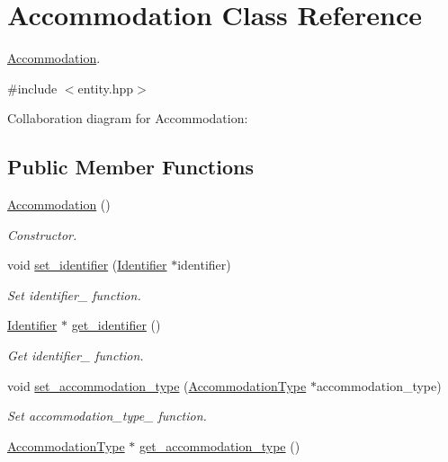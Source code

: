\hypertarget{classAccommodation}{}\section{Accommodation Class Reference}
\label{classAccommodation}


\hyperlink{classAccommodation}{Accommodation}.  




{\ttfamily \#include $<$entity.\+hpp$>$}



Collaboration diagram for Accommodation\+:
\subsection*{Public Member Functions}
\begin{DoxyCompactItemize}
\item 
\hyperlink{classAccommodation_a6bc8f615e1bdb56c47f1c64d125ba6de}{Accommodation} ()
\begin{DoxyCompactList}\small\item\em Constructor. \end{DoxyCompactList}\item 
void \hyperlink{classAccommodation_a10f294e3f2beb3e3c160ccacf6e3ba69}{set\+\_\+identifier} (\hyperlink{classIdentifier}{Identifier} $\ast$identifier)
\begin{DoxyCompactList}\small\item\em Set identifier\+\_\+ function. \end{DoxyCompactList}\item 
\hyperlink{classIdentifier}{Identifier} $\ast$ \hyperlink{classAccommodation_a4d4c2906609e9ae376634d0db227eace}{get\+\_\+identifier} ()
\begin{DoxyCompactList}\small\item\em Get identifier\+\_\+ function. \end{DoxyCompactList}\item 
void \hyperlink{classAccommodation_a1fc37c5b6862a102b5d81f6821a456de}{set\+\_\+accommodation\+\_\+type} (\hyperlink{classAccommodationType}{Accommodation\+Type} $\ast$accommodation\+\_\+type)
\begin{DoxyCompactList}\small\item\em Set accommodation\+\_\+type\+\_\+ function. \end{DoxyCompactList}\item 
\hyperlink{classAccommodationType}{Accommodation\+Type} $\ast$ \hyperlink{classAccommodation_ae88d4e896a7b831fa9c46f66018f6c75}{get\+\_\+accommodation\+\_\+type} ()

\end{DoxyCompactItemize}
